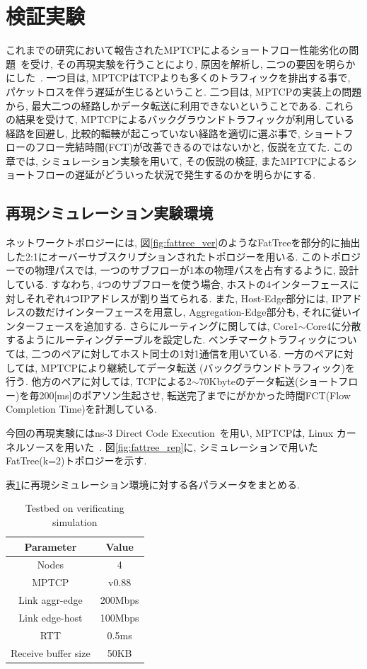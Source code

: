 \documentclass[10pt, a4paper, twocolumn]{jsarticle}
\begin{document}
\section{検証実験}
\label{sec:verification}
これまでの研究において報告されたMPTCPによるショートフロー性能劣化の問題~\cite{improving}を受け, その再現実験を行うことにより,
原因を解析し, 二つの要因を明らかにした~\cite{mptcp_ana}.
一つ目は, MPTCPはTCPよりも多くのトラフィックを排出する事で, パケットロスを伴う遅延が生じるということ.
二つ目は, MPTCPの実装上の問題から, 最大二つの経路しかデータ転送に利用できないということである.
これらの結果を受けて, MPTCPによるバックグラウンドトラフィックが利用している経路を回避し, 比較的輻輳が起こっていない経路を適切に選ぶ事で,
ショートフローのフロー完結時間(FCT)が改善できるのではないかと, 仮説を立てた.
この章では, シミュレーション実験を用いて, その仮説の検証, またMPTCPによるショートフローの遅延がどういった状況で発生するのかを明らかにする.

\subsection{再現シミュレーション実験環境}
ネットワークトポロジーには,
図\ref{fig:fattree_ver}のようなFatTreeを部分的に抽出した2:1にオーバーサブスクリプションされたトポロジーを用いる.
このトポロジーでの物理パスでは, 一つのサブフローが1本の物理パスを占有するように, 設計している.
すなわち, 4つのサブフローを使う場合, ホストの4インターフェースに対しそれぞれ4つIPアドレスが割り当てられる.
また, Host-Edge部分には, IPアドレスの数だけインターフェースを用意し, Aggregation-Edge部分も,
それに従いインターフェースを追加する.
さらにルーティングに関しては, Core1$\sim$Core4に分散するようにルーティングテーブルを設定した.
ベンチマークトラフィックについては, 二つのペアに対してホスト同士の1対1通信を用いている.
一方のペアに対しては, MPTCPにより継続してデータ転送 (バックグラウンドトラフィック)を行う.
他方のペアに対しては, TCPによる2$\sim$70Kbyteのデータ転送(ショートフロー)を毎200[ms]のポアソン生起させ,
転送完了までにがかかった時間FCT(Flow Completion Time)を計測している.

今回の再現実験にはns-3 Direct Code Execution~\cite{ns3}を用い, MPTCPは, Linux
カーネルソースを用いた~\cite{mptcp_linux}.
図\ref{fig:fattree_rep}に, シミュレーションで用いたFatTree(k=2)トポロジーを示す.


表\ref{table:testbed_ver}に再現シミュレーション環境に対する各パラメータをまとめる.
\begin{table}[h]
\begin{center}
\footnotesize
\begin{tabular}{c|c}
\hline
Parameter & Value \\ \hline \hline
Nodes & 4 \\
MPTCP & v0.88 \\
Link aggr-edge & 200Mbps \\
Link edge-host & 100Mbps \\
RTT & 0.5ms\\
Receive buffer size & 50KB \\
\hline
\end{tabular}
\caption{Testbed on verificating simulation}
\label{table:testbed_ver}
\end{center}
\end{table}
\end{document}
